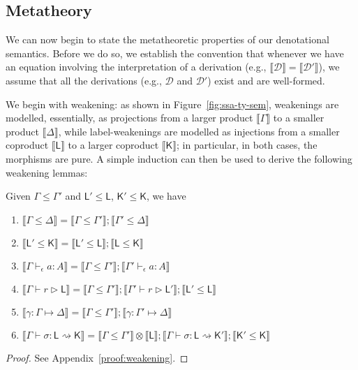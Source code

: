 \documentclass[acmsmall,screen,review]{acmart}
\newcommand{\mc}[1]{\ensuremath{\mathcal{#1}}}
\newcommand{\ms}[1]{\ensuremath{\mathsf{#1}}}
\newcommand{\hasty}[4]{#1 \vdash_{#2} #3: {#4}}
\newcommand{\haslb}[3]{#1 \vdash #2 \rhd #3}
\newcommand{\issubst}[3]{#1: #2 \mapsto #3}
\newcommand{\lbsubst}[4]{#1 \vdash #2: #3 \rightsquigarrow #4}
\newcommand{\dnt}[1]{\llbracket{#1}\rrbracket}
\begin{document}
\subsection{Metatheory}

We can now begin to state the metatheoretic properties of our denotational semantics. Before we do so, we establish the convention that whenever we have an equation involving the interpretation of a derivation (e.g., $\dnt{\mathcal{D}} = \dnt{\mc{D}'}$), we assume that all the derivations (e.g., $\mc{D}$ and $\mc{D}'$) exist and are well-formed. 

We begin with
weakening: as shown in Figure~\ref{fig:ssa-ty-sem}, weakenings are modelled, essentially, as
projections from a larger product $\dnt{\Gamma}$ to a smaller product $\dnt{\Delta}$, while
label-weakenings are modelled as injections from a smaller coproduct $\dnt{\ms{L}}$ to a larger
coproduct $\dnt{\ms{K}}$; in particular, in both cases, the morphisms are pure.  A simple induction
can then be used to derive the following weakening lemmas:
\begin{lemma}[name=(Label) Weakening, restate=weakeninglem]
  Given $\Gamma \leq \Gamma'$ and $\ms{L}' \leq \ms{L}$, $\ms{K}' \leq \ms{K}$, we have
  \begin{enumerate}[label=(\alph*)]
    \item $\dnt{\Gamma \leq \Delta} = \dnt{\Gamma \leq \Gamma'};\dnt{\Gamma' \leq \Delta}$
      \label{itm:varwk}
    \item $\dnt{\ms{L}' \leq \ms{K}} = \dnt{\ms{L}' \leq \ms{L}};\dnt{\ms{L} \leq \ms{K}}$
      \label{itm:lbwk}
    \item $\dnt{\hasty{\Gamma}{\epsilon}{a}{A}} 
      = \dnt{\Gamma \leq \Gamma'};\dnt{\hasty{\Gamma'}{\epsilon}{a}{A}}$
      \label{itm:expwk}
    \item $\dnt{\haslb{\Gamma}{r}{\ms{L}}}
      = \dnt{\Gamma \leq \Gamma'}
      ; \dnt{\haslb{\Gamma'}{r}{\ms{L}'}}
      ; \dnt{\ms{L}' \leq \ms{L}}$
      \label{itm:regwk}
    \item $\dnt{\issubst{\gamma}{\Gamma}{\Delta}}
      = \dnt{\Gamma \leq \Gamma'};\dnt{\issubst{\gamma}{\Gamma'}{\Delta}}$
      \label{itm:substwk}
    \item $\dnt{\lbsubst{\Gamma}{\sigma}{\ms{L}}{\ms{K}}}
      = \dnt{\Gamma \leq \Gamma'} \otimes \dnt{\ms{L}}
      ; \dnt{\lbsubst{\Gamma}{\sigma}{\ms{L}}{\ms{K}'}}
      ; \dnt{\ms{K}' \leq \ms{K}}
      $
      \label{itm:lbsubstwk}
  \end{enumerate}
  \label{lem:wk}
\end{lemma}
\begin{proof}
  See Appendix~\ref{proof:weakening}.
\end{proof}
\end{document}
